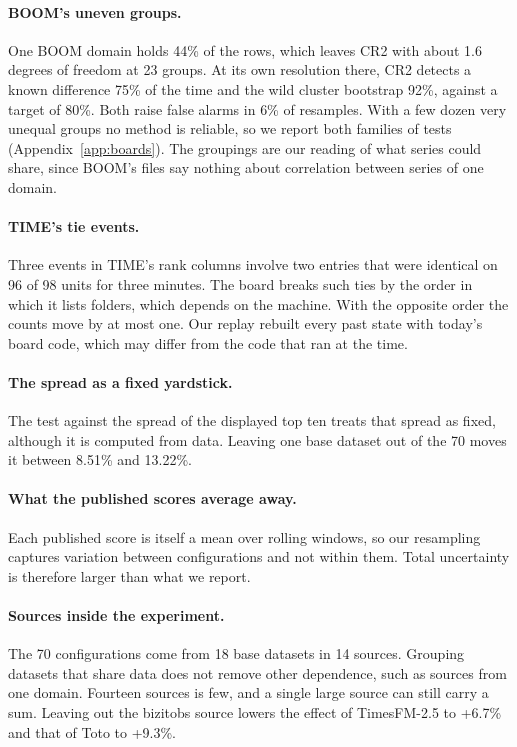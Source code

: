\documentclass{article}
\begin{document}
\paragraph{BOOM's uneven groups.} One BOOM domain holds 44\% of the rows, which leaves CR2 with
about 1.6 degrees of freedom at 23 groups. At its own resolution there, CR2 detects a known
difference 75\% of the time and the wild cluster bootstrap 92\%, against a target of 80\%.
Both raise false alarms in 6\% of resamples. With a few dozen very unequal groups no method is
reliable, so we report both families of tests (Appendix~\ref{app:boards}). The groupings are
our reading of what series could share, since BOOM's files say nothing about correlation
between series of one domain.

\paragraph{TIME's tie events.} Three events in TIME's rank columns involve two entries that were
identical on 96 of 98 units for three minutes. The board breaks such ties by the order in which
it lists folders, which depends on the machine. With the opposite order the counts move by at
most one. Our replay rebuilt every past state with today's board code, which may differ from
the code that ran at the time.

\paragraph{The spread as a fixed yardstick.} The test against the spread of the displayed top
ten treats that spread as fixed, although it is computed from data. Leaving one base dataset
out of the 70 moves it between 8.51\% and 13.22\%.

\paragraph{What the published scores average away.} Each published score is itself a mean over
rolling windows, so our resampling captures variation between configurations and not within
them. Total uncertainty is therefore larger than what we report.

\paragraph{Sources inside the experiment.} The 70 configurations come from 18 base datasets in
14 sources. Grouping datasets that share data does not remove other dependence, such as
sources from one domain. Fourteen sources is few, and a single large source can still carry a
sum. Leaving out the bizitobs source lowers the effect of TimesFM-2.5 to +6.7\% and that of
Toto to +9.3\%.
\end{document}
